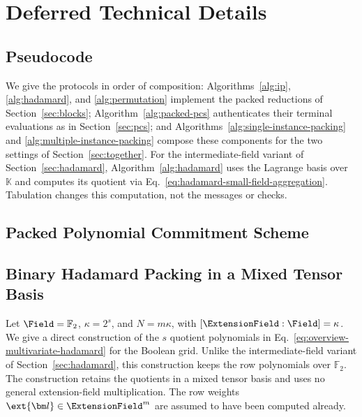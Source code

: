\clearpage
\section{Deferred Technical Details}
\label{appx:tech}

\subsection{Pseudocode}
\label{appx:pseudocode}

We give the protocols in order of composition:
Algorithms~\ref{alg:ip}, \ref{alg:hadamard}, and
\ref{alg:permutation} implement the packed reductions of
Section~\ref{sec:blocks}; Algorithm~\ref{alg:packed-pcs}
authenticates their terminal evaluations as in Section~\ref{sec:pcs};
and Algorithms~\ref{alg:single-instance-packing} and
\ref{alg:multiple-instance-packing} compose these components
for the two settings of Section~\ref{sec:together}.
For the intermediate-field variant of Section~\ref{sec:hadamard},
Algorithm~\ref{alg:hadamard} uses the Lagrange basis over
\(\mathbb K\) and computes its quotient via
Eq.~\eqref{eq:hadamard-small-field-aggregation}.
Tabulation changes this computation, not the messages or checks.








\clearpage

\subsection{Packed Polynomial Commitment Scheme}
\label{appx:pcs}



\clearpage

\subsection{Binary Hadamard Packing in a Mixed Tensor Basis}
\label{appx:binary-hadamard}

Let \(\Field=\mathbb F_2\), \(\kappa=2^s\), and
\(N=m\kappa\), with \([\ExtensionField:\Field]=\kappa\).
We give a direct construction of the \(s\) quotient polynomials
in Eq.~\eqref{eq:overview-multivariate-hadamard} for the Boolean
grid. Unlike the intermediate-field variant of
Section~\ref{sec:hadamard}, this construction keeps the row
polynomials over \(\mathbb F_2\).
The construction retains the quotients in a mixed tensor
basis and uses no general extension-field multiplication.
The row weights \(\ext{\bm l}\in\ExtensionField^m\) are assumed
to have been computed already.

